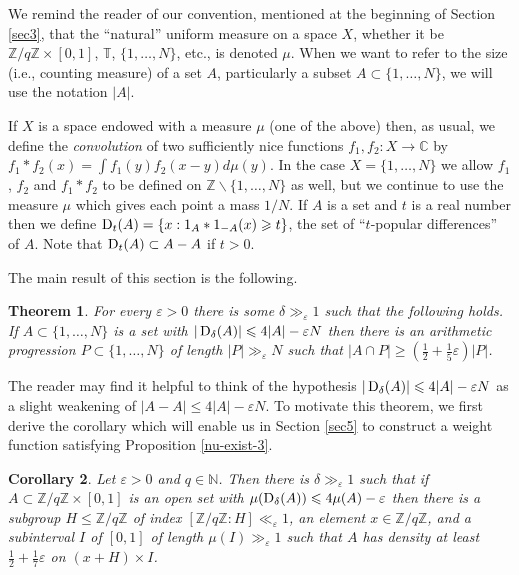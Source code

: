 \documentclass[10pt,reqno]{amsart}
\newtheorem{theorem}{Theorem}[section]
\newtheorem{corollary}[theorem]{Corollary}
\theoremstyle{definition}
\theoremstyle{remark}
\renewcommand{\leq}{\leqslant}
\renewcommand{\geq}{\geqslant}
\def\C{\mathbb{C}}
\def\Z{\mathbb{Z}}
\def\N{\mathbb{N}}
\def\T{\mathbb{T}}
\def\eps{\varepsilon}
\numberwithin{equation}{section}
\begin{document}
We remind the reader of our convention, mentioned at the beginning of Section \ref{sec3}, that the ``natural'' uniform measure on a space $X$, whether it be $\Z/q\Z\times[0,1]$, $\T$, $\{1,\dots,N\}$, etc., is denoted $\mu$. When we want to refer to the size (i.e., counting measure) of a set $A$, particularly a subset $A \subset \{1,\ldots,N\}$, we will use the notation $|A|$.

If $X$ is a space endowed with a measure $\mu$ (one of the above) then, as usual, we define the \emph{convolution} of two sufficiently nice functions $f_1, f_2 : X \to \C$ by $f_1 \ast f_2(x) = \int f_1(y) f_2(x - y) d\mu(y)$. In the case $X=\{1,\dots,N\}$ we allow $f_1$, $f_2$ and $f_1\ast f_2$ to be defined on $\Z\backslash\{1,\dots,N\}$ as well, but we continue to use the measure $\mu$ which gives each point a mass $1/N$. If $A$ is a set and $t$ is a real number then we define $\Sym_t(A) = \{ x : 1_A \ast 1_{-A}(x) \geq t\}$, the set of ``$t$-popular differences'' of $A$. Note that $\operatorname{D}_t(A) \subset A - A$ if $t > 0$.

The main result of this section is the following.

\begin{theorem}\label{discthm} For every $\eps > 0$ there is some $\delta\gg_\eps 1$ such that the following holds. If $A \subset \{1,\dots, N\}$ is a set with $|\Sym_{\delta}(A)| \leq 4|A| - \eps N$ then there is an arithmetic progression $P \subset \{1,\dots, N\}$ of length $|P|\gg_\eps N$ such that $|A \cap P| \geq (\frac{1}{2} + \tfrac{1}{5} \eps)|P|$.
\end{theorem}

The reader may find it helpful to think of the hypothesis $|\Sym_{\delta}(A)|\leq 4|A| - \eps N$ as a slight weakening of $|A-A|\leq 4|A|-\eps N$. To motivate this theorem, we first derive the corollary which will enable us in Section \ref{sec5} to construct a weight function satisfying Proposition \ref{nu-exist-3}.

\begin{corollary}\label{thm:stronger-thmconj} Let $\eps > 0$ and $q  \in \N$. Then there is $\delta\gg_\eps 1$ such that if $A\subset \Z/q\Z\times[0,1]$ is an open set with $\mu(\Sym_{\delta}(A)) \leq 4 \mu(A) - \eps$ then there is a subgroup $H\leq\Z/q\Z$ of index $[\Z/q\Z:H] \ll_{\eps} 1$, an element $x \in \Z/q\Z$, and a subinterval $I$ of $[0,1]$ of length $\mu(I)\gg_{\eps} 1$ such that $A$ has density at least $\tfrac{1}{2} + \tfrac{1}{7}\eps$ on $(x+H)\times I$.
\end{corollary}
\end{document}
